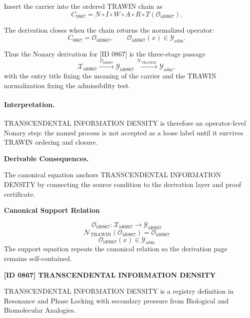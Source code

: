 Insert the carrier into the ordered TRAWIN chain as\[
C_{0867}=N\circ I\circ W\circ A\circ R\circ T(\mathcal{O}_{\mathrm{id0867}}).
\]

The derivation closes when the chain returns the normalized operator:\[
C_{0867}=\mathcal{O}_{\mathrm{id0867}},\qquad \mathcal{O}_{\mathrm{id0867}}(x)\in\mathcal{Y}_{\mathrm{adm}}.
\]

Thus the Nonary derivation for [ID 0867] is the three-stage passage
\[
\mathcal{X}_{\mathrm{id0867}}\xrightarrow{\,\mathcal{O}_{\mathrm{id0867}}\,} \mathcal{Y}_{\mathrm{id0867}}\xrightarrow{\,\mathcal{N}_{\mathrm{TRAWIN}}\,} \mathcal{Y}_{\mathrm{adm}},
\]
with the entry title fixing the meaning of the carrier and the TRAWIN normalization fixing the admissibility test.

\paragraph{Interpretation.} TRANSCENDENTAL INFORMATION DENSITY is therefore an operator-level Nonary step: the named process is not accepted as a loose label until it survives TRAWIN ordering and closure.

\par\vspace{0.35em}
\noindent\textbf{Derivable Consequences.}\quad
\begingroup
\footnotesize
\raggedright
The canonical equation anchors TRANSCENDENTAL INFORMATION DENSITY by connecting the source condition to the derivation layer and proof certificate.
\par\endgroup

\noindent\textbf{Canonical Support Relation}\par
\[
\mathcal{O}_{\mathrm{id0867}}:\mathcal{X}_{\mathrm{id0867}}\longrightarrow\mathcal{Y}_{\mathrm{id0867}}
\]
\[
\mathcal{N}_{\mathrm{TRAWIN}}(\mathcal{O}_{\mathrm{id0867}})=\mathcal{O}_{\mathrm{id0867}}
\]
\[
\mathcal{O}_{\mathrm{id0867}}(x)\in\mathcal{Y}_{\mathrm{adm}}
\]
\noindent The support equation repeats the canonical relation so the derivation page remains self-contained.\par

\clearpage
\noindent\textbf{[ID 0867] TRANSCENDENTAL INFORMATION DENSITY}\par
\vspace{0.35em}
\begingroup\small
{}
TRANSCENDENTAL INFORMATION DENSITY is a registry definition in Resonance and Phase Locking with secondary pressure from Biological and Biomolecular Analogies.

